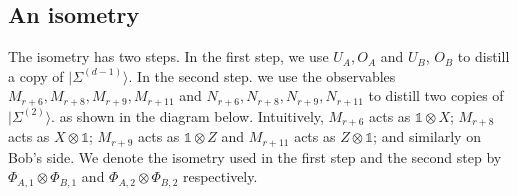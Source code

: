 \documentclass[11pt,letterpaper]{article}
\newcommand{\ket}[1]{|#1\rangle}
\newcommand{\x}{\otimes}
\newcommand{\1}{\mathbb{1}}
\newcommand{\EPR}[1]{\Sigma^{(#1)}}
\theoremstyle{definition}
\begin{document}
\subsection{An isometry}
\label{sec:isometry}
The isometry has two steps. In the first step, 
we use $U_A, O_A$ and $U_B$, $O_B$ to distill a copy of $\ket{\EPR{d-1}}$.
In the second step. we use the observables $M_{r+6},M_{r+8}, M_{r+9}, M_{r+11}$ and 
$N_{r+6}, N_{r+8}, N_{r+9}, N_{r+11}$ to distill two copies of $\ket{\EPR{2}}$.
as shown in the diagram below. Intuitively, $M_{r+6}$ acts as $\1 \x X$; $M_{r+8}$ acts as $X \x \1$;
$M_{r+9}$ acts as $\1 \x Z$ and $M_{r+11}$ acts as $Z \x \1$; and similarly on Bob's side.
We denote the isometry used in the first step and the second step by $\Phi_{A,1} \x \Phi_{B,1}$ and 
$\Phi_{A,2} \x \Phi_{B,2}$ respectively.
\end{document}
